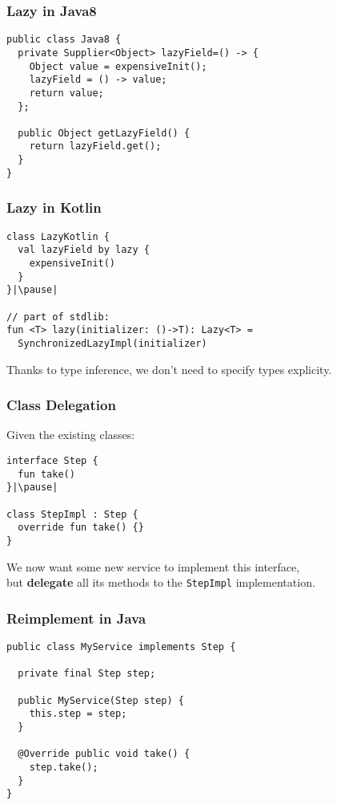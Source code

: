 \begin{frame}[fragile] \frametitle{Lazy in Java8}
\begin{lstlisting}
public class Java8 {
  private Supplier<Object> lazyField=() -> {
    Object value = expensiveInit();
    lazyField = () -> value;
    return value;
  };

  public Object getLazyField() {
    return lazyField.get();
  }
}
\end{lstlisting}
\end{frame}

\begin{frame}[fragile] \frametitle{Lazy in Kotlin}
\begin{lstlisting}
class LazyKotlin {
  val lazyField by lazy {
    expensiveInit()
  }
}|\pause|

// part of stdlib:
fun <T> lazy(initializer: ()->T): Lazy<T> =
  SynchronizedLazyImpl(initializer)
\end{lstlisting}
\pause
Thanks to type inference, we don't need to specify types explicity.
\end{frame}



\begin{frame}[fragile] \frametitle{Class Delegation}
Given the existing classes:
\begin{lstlisting}
interface Step {
  fun take()
}|\pause|

class StepImpl : Step {
  override fun take() {}
}
\end{lstlisting}
\pause
We now want some new service to implement this interface, \\
but \textbf{delegate} all its methods to the \texttt{StepImpl} implementation.
\end{frame}

\begin{frame}[fragile] \frametitle{Reimplement in Java}
\begin{lstlisting}
public class MyService implements Step {

  private final Step step;
  
  public MyService(Step step) {
    this.step = step;
  }
  
  @Override public void take() {
    step.take();
  }
}
\end{lstlisting}
\end{frame}


